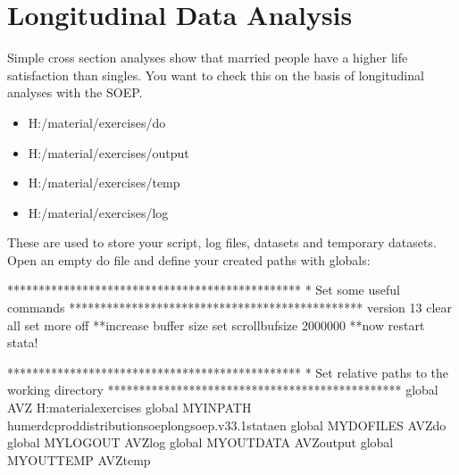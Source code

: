 \documentclass[letterpaper,10pt,openany,onesideH,english]{sphinxmanual}
\begin{document}
\section{Longitudinal Data Analysis}
\label{\detokenize{Working with SOEP Data/index:longitudinal-data-analysis}}
Simple cross section analyses show that married people have a higher life satisfaction than singles. You want to check this on the basis of longitudinal analyses with the SOEP.


\begin{figure}[H]
\centering

\noindent{}
\end{figure}

\begin{itemize}
\item {} 
H:/material/exercises/do

\item {} 
H:/material/exercises/output

\item {} 
H:/material/exercises/temp

\item {} 
H:/material/exercises/log

\end{itemize}

These are used to store your script, log files, datasets and temporary datasets. Open an empty do file and define your created paths with globals:

%
\begin{sphinxVerbatim}[commandchars=\\\{\},numbers=left,firstnumber=1,stepnumber=1]
***********************************************
* Set some useful commands
***********************************************
version 13
clear all
set more off
**increase buffer size
set scrollbufsize 2000000
**now restart stata!

***********************************************
* Set relative paths to the working directory
***********************************************
global AVZ 	\PYGZdq{}H:\PYGZbs{}material\PYGZbs{}exercises\PYGZdq{}
global MY\PYGZus{}IN\PYGZus{}PATH \PYGZdq{}\PYGZbs{}\PYGZbs{}hume\PYGZbs{}rdc\PYGZhy{}prod\PYGZbs{}distribution\PYGZbs{}soep\PYGZhy{}long\PYGZbs{}soep.v33.1\PYGZbs{}stata\PYGZus{}en\PYGZbs{}\PYGZdq{}
global MY\PYGZus{}DO\PYGZus{}FILES \PYGZdq{}\PYGZdl{}AVZ\PYGZbs{}do\PYGZbs{}\PYGZdq{}
global MY\PYGZus{}LOG\PYGZus{}OUT \PYGZdq{}\PYGZdl{}AVZ\PYGZbs{}log\PYGZbs{}\PYGZdq{}
global MY\PYGZus{}OUT\PYGZus{}DATA \PYGZdq{}\PYGZdl{}AVZ\PYGZbs{}output\PYGZbs{}\PYGZdq{}
global MY\PYGZus{}OUT\PYGZus{}TEMP \PYGZdq{}\PYGZdl{}AVZ\PYGZbs{}temp\PYGZbs{}\PYGZdq{}
\end{sphinxVerbatim}
\end{document}
